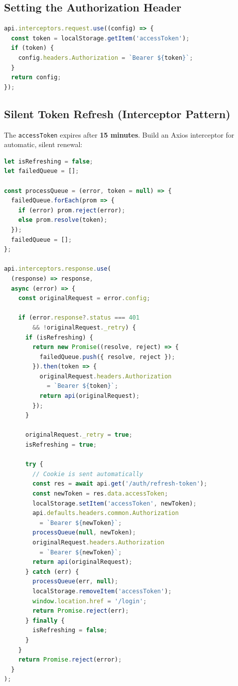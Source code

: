 \subsection{Setting the Authorization Header}

\begin{lstlisting}[language=JavaScript,title=Request Interceptor]
api.interceptors.request.use((config) => {
  const token = localStorage.getItem('accessToken');
  if (token) {
    config.headers.Authorization = `Bearer ${token}`;
  }
  return config;
});
\end{lstlisting}

\subsection{Silent Token Refresh (Interceptor Pattern)}

The \texttt{accessToken} expires after \textbf{15 minutes}. Build an Axios interceptor for automatic, silent renewal:

\begin{lstlisting}[language=JavaScript,title=Response Interceptor for Token Refresh]
let isRefreshing = false;
let failedQueue = [];

const processQueue = (error, token = null) => {
  failedQueue.forEach(prom => {
    if (error) prom.reject(error);
    else prom.resolve(token);
  });
  failedQueue = [];
};

api.interceptors.response.use(
  (response) => response,
  async (error) => {
    const originalRequest = error.config;

    if (error.response?.status === 401
        && !originalRequest._retry) {
      if (isRefreshing) {
        return new Promise((resolve, reject) => {
          failedQueue.push({ resolve, reject });
        }).then(token => {
          originalRequest.headers.Authorization
            = `Bearer ${token}`;
          return api(originalRequest);
        });
      }

      originalRequest._retry = true;
      isRefreshing = true;

      try {
        // Cookie is sent automatically
        const res = await api.get('/auth/refresh-token');
        const newToken = res.data.accessToken;
        localStorage.setItem('accessToken', newToken);
        api.defaults.headers.common.Authorization
          = `Bearer ${newToken}`;
        processQueue(null, newToken);
        originalRequest.headers.Authorization
          = `Bearer ${newToken}`;
        return api(originalRequest);
      } catch (err) {
        processQueue(err, null);
        localStorage.removeItem('accessToken');
        window.location.href = '/login';
        return Promise.reject(err);
      } finally {
        isRefreshing = false;
      }
    }
    return Promise.reject(error);
  }
);
\end{lstlisting}

